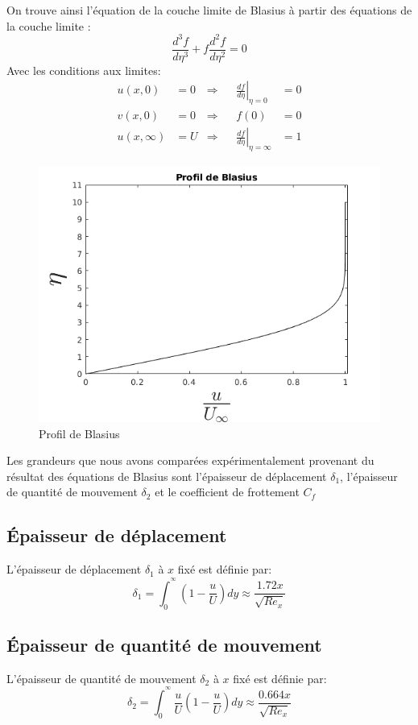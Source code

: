 On trouve ainsi l'équation de la couche limite de Blasius à partir des équations de la couche limite :
\begin{equation}	
	\frac{d^{3}f}{d\eta^{3}} + f\frac{d^{2} f}{d\eta^{2}} = 0
\end{equation}
Avec les conditions aux limites:
\begin{align}
	u(x,0) &= 0 &\Rightarrow &&
	\left.
	\frac{d f}{d \eta}     \right|_{\eta = 0} &= 0
	\\
	v(x,0) &= 0 &\Rightarrow &&
	f(0) &= 0
	\\
	u(x,\infty) &= U &\Rightarrow &&
	\left.
	\frac{d f}{d \eta} \right|_{\eta = \infty} &= 1
\end{align}
\newpage
\begin{figure}[ht]
	\centering
	\includegraphics[scale = 0.6]{./gfx/Blasius.png}
	\caption{Profil de Blasius}
\end{figure}
Les grandeurs que nous avons comparées expérimentalement provenant du résultat des équations de Blasius sont l'épaisseur de déplacement $\delta_{1}$, l'épaisseur de quantité de mouvement $\delta_{2}$ et le coefficient de frottement $C_{f}$
\subsection{Épaisseur de déplacement}
L'épaisseur de déplacement $\delta_{1}$ à $x$ fixé est définie par:
\begin{equation}
	\delta_{1} = 
	\int_{0}^{^\infty}
	\left(
	1 - 
	\frac{u}{U}
	\right)
	dy
	\approx \frac{1.72x}{\sqrt{Re_{x}}}
\end{equation}
\subsection{Épaisseur de quantité de mouvement}
L'épaisseur de quantité de mouvement $\delta_{2}$ à $x$ fixé est définie par:
\begin{equation}
	\delta_{2} = 
	\int_{0}^{^\infty}
	\frac{u}{U}
	\left(
	1 - 
	\frac{u}{U}
	\right)
	dy
	\approx \frac{0.664x}{\sqrt{Re_{x}}}
\end{equation}
